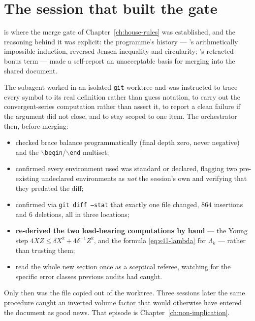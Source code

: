 \section{The session that built the gate}
\label{sec:s41-gate}

 is where the merge gate of Chapter~\ref{ch:house-rules} was
established, and the reasoning behind it was explicit: the programme's history
--- 's arithmetically impossible induction, reversed Jensen inequality
and circularity; 's retracted bonus term --- made a self-report an
unacceptable basis for merging into the shared document.

The subagent worked in an isolated \texttt{git} worktree and was instructed to
trace every symbol to its real definition rather than guess notation, to carry
out the convergent-series computation rather than assert it, to report a clean
failure if the argument did not close, and to stay scoped to one item. The
orchestrator then, before merging:

\begin{itemize}[leftmargin=1.6em]
\item checked brace balance programmatically (final depth zero, never
  negative) and the \(\backslash\)\texttt{begin}/\(\backslash\)\texttt{end}
  multiset;
\item confirmed every environment used was standard or declared, flagging two
  pre-existing undeclared environments as \emph{not} the session's own and
  verifying that they predated the diff;
\item confirmed via \texttt{git diff --stat} that exactly one file changed,
  \(864\) insertions and \(6\) deletions, all in three locations;
\item \textbf{re-derived the two load-bearing computations by hand} --- the
  Young step \(4XZ\le\delta X^2+4\delta^{-1}Z^2\), and the formula
  \eqref{eq:s41-lambda} for \(\Lambda_k\) --- rather than trusting them;
\item read the whole new section once as a sceptical referee, watching for the
  specific error classes previous audits had caught.
\end{itemize}

Only then was the file copied out of the worktree. Three sessions later the
same procedure caught an inverted volume factor that would otherwise have
entered the document as good news. That episode is
Chapter~\ref{ch:non-implication}.

